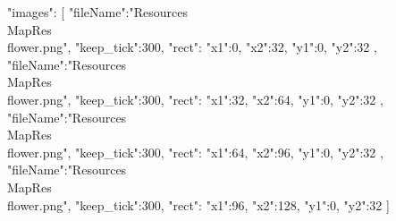 {
	"images":
	[
		{
			"fileName":"Resources\\MapRes\\flower.png",
			"keep_tick":300,
			"rect":
			{
				"x1":0,
				"x2":32,
				"y1":0,
				"y2":32
			}
		},
		{
			"fileName":"Resources\\MapRes\\flower.png",
			"keep_tick":300,
			"rect":
			{
				"x1":32,
				"x2":64,
				"y1":0,
				"y2":32
			}
		},
		{
			"fileName":"Resources\\MapRes\\flower.png",
			"keep_tick":300,
			"rect":
			{
				"x1":64,
				"x2":96,
				"y1":0,
				"y2":32
			}
		},
		{
			"fileName":"Resources\\MapRes\\flower.png",
			"keep_tick":300,
			"rect":
			{
				"x1":96,
				"x2":128,
				"y1":0,
				"y2":32
			}
		}
	]
}